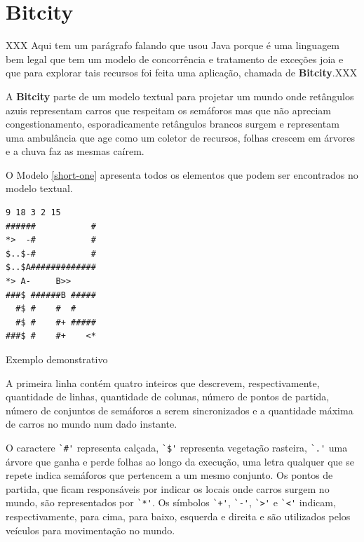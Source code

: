 \chapter{Bitcity}

XXX Aqui tem um parágrafo falando que usou Java porque é uma linguagem
bem legal que tem um modelo de concorrência e tratamento de exceções
joia e que para explorar tais recursos foi feita uma aplicação,
chamada de \textbf{Bitcity}.XXX

A \textbf{Bitcity} parte de um modelo textual para projetar um mundo
onde retângulos azuis representam carros que respeitam os semáforos
mas que não apreciam congestionamento, esporadicamente
retângulos brancos surgem e representam uma ambulância que age como um
coletor de recursos, folhas crescem em árvores e a chuva faz as mesmas
caírem.

O Modelo \ref{short-one} apresenta todos os elementos que podem ser
encontrados no modelo textual.

\begin{model}
\begin{verbatim}
9 18 3 2 15
######           #
*>  -#           #
$..$-#           # 
$..$A#############
*> A-     B>>
###$ ######B #####
  #$ #    #  #    
  #$ #    #+ #####
###$ #    #+    <*
\end{verbatim}
  \caption{Exemplo demonstrativo \label{short-one}}
\end{model}

A primeira linha contém quatro inteiros que descrevem, respectivamente,
quantidade de linhas, quantidade de colunas, número de pontos de
partida, número de conjuntos de semáforos a serem sincronizados e a
quantidade máxima de carros no mundo num dado instante.

O caractere \verb!`#'! representa calçada, \verb!`$'! representa
vegetação rasteira, \verb!`.'! uma árvore que ganha e perde folhas ao
longo da execução, uma letra qualquer que se repete indica semáforos
que pertencem a um mesmo conjunto. Os pontos de partida, que ficam
responsáveis por indicar os locais onde carros surgem no mundo, são
representados por \verb!`*'!. Os símbolos \verb!`+'!, \verb!`-'!,
\verb!`>'! e \verb!`<'! indicam, respectivamente, para cima, para
baixo, esquerda e direita e são utilizados pelos veículos para
movimentação no mundo.

